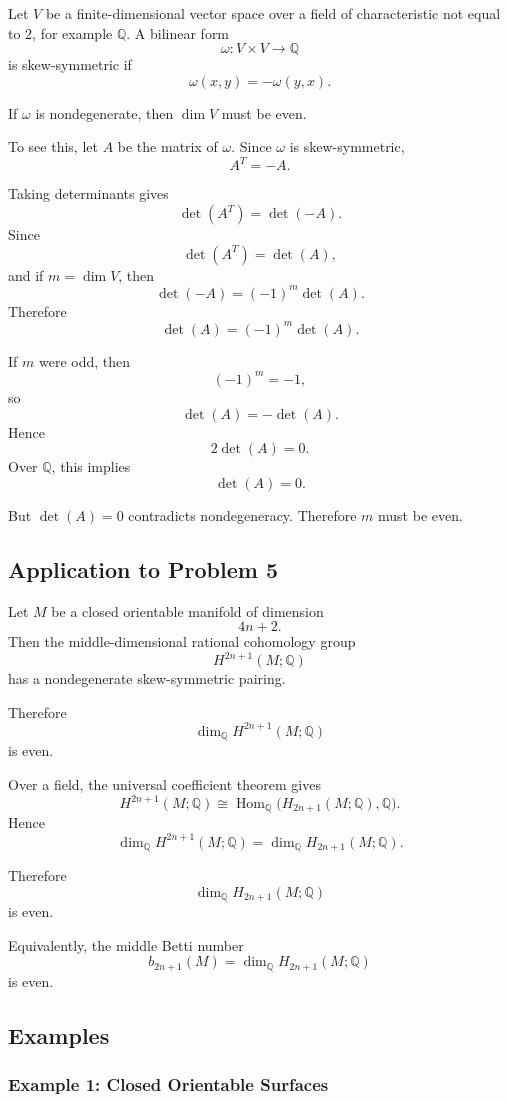 \documentclass[12pt,a4paper]{article}
\theoremstyle{notespace}
\begin{document}
Let \(V\) be a finite-dimensional vector space over a field of characteristic
not equal to \(2\), for example \(\mathbb Q\). A bilinear form
\[
\omega:V\times V\to \mathbb Q
\]
is skew-symmetric if
\[
\omega(x,y)=-\omega(y,x).
\]

If \(\omega\) is nondegenerate, then \(\dim V\) must be even.

To see this, let \(A\) be the matrix of \(\omega\). Since \(\omega\) is
skew-symmetric,
\[
A^T=-A.
\]

Taking determinants gives
\[
\det(A^T)=\det(-A).
\]
Since
\[
\det(A^T)=\det(A),
\]
and if \(m=\dim V\), then
\[
\det(-A)=(-1)^m\det(A).
\]
Therefore
\[
\det(A)=(-1)^m\det(A).
\]

If \(m\) were odd, then
\[
(-1)^m=-1,
\]
so
\[
\det(A)=-\det(A).
\]
Hence
\[
2\det(A)=0.
\]
Over \(\mathbb Q\), this implies
\[
\det(A)=0.
\]

But \(\det(A)=0\) contradicts nondegeneracy. Therefore \(m\) must be even.

\subsection{Application to Problem 5}

Let \(M\) be a closed orientable manifold of dimension
\[
4n+2.
\]
Then the middle-dimensional rational cohomology group
\[
H^{2n+1}(M;\mathbb Q)
\]
has a nondegenerate skew-symmetric pairing.

Therefore
\[
\dim_{\mathbb Q}H^{2n+1}(M;\mathbb Q)
\]
is even.

Over a field, the universal coefficient theorem gives
\[
H^{2n+1}(M;\mathbb Q)
\cong
\operatorname{Hom}_{\mathbb Q}
\bigl(H_{2n+1}(M;\mathbb Q),\mathbb Q\bigr).
\]
Hence
\[
\dim_{\mathbb Q}H^{2n+1}(M;\mathbb Q)
=
\dim_{\mathbb Q}H_{2n+1}(M;\mathbb Q).
\]

Therefore
\[
\dim_{\mathbb Q}H_{2n+1}(M;\mathbb Q)
\]
is even.

Equivalently, the middle Betti number
\[
b_{2n+1}(M)
=
\dim_{\mathbb Q}H_{2n+1}(M;\mathbb Q)
\]
is even.

\subsection{Examples}

\subsubsection{Example 1: Closed Orientable Surfaces}
\end{document}
